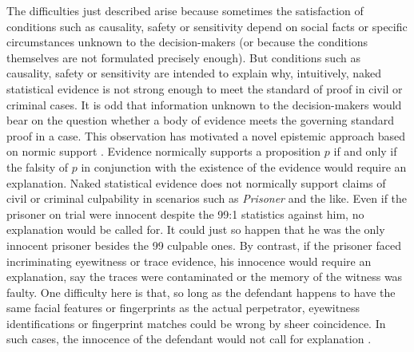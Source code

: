 \documentclass{article}
\begin{document}
The difficulties just described arise because sometimes the satisfaction of conditions such as causality, safety or sensitivity  %
depend on social facts or specific circumstances unknown to the decision-makers (or because the conditions themselves are not formulated precisely   enough).
But conditions such as causality, safety or sensitivity are intended to explain why, intuitively, naked statistical evidence is not strong enough to meet the standard of proof in civil or criminal cases. It is odd that information unknown to the decision-makers would bear on the question whether a body of evidence meets the governing standard proof in a case. 
This observation has motivated a novel epistemic approach based on normic support \citep{smith2017}. Evidence normically supports a proposition $p$ if and only if the falsity of $p$ in conjunction with the existence of the evidence would require an explanation.  Naked statistical evidence does not normically support claims of civil or criminal culpability in scenarios such as \textit{Prisoner} and the like. Even if the prisoner on trial were innocent despite the 99:1 statistics against him, no explanation would be called for. It could just so happen that he was the only innocent prisoner besides the 99 culpable ones. %
By contrast, if the prisoner faced incriminating eyewitness or trace evidence, his innocence would require an explanation, say the traces were contaminated or the memory of the witness was faulty. One difficulty here is that, so long as the defendant  happens to have the same facial features or  fingerprints as the actual perpetrator, eyewitness identifications or fingerprint matches could be wrong by sheer coincidence. 
In such cases, the innocence of the defendant would not call for explanation  
\citep{dibello2020}.
\end{document}
